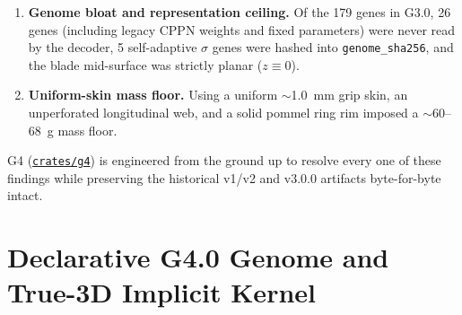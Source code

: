 \documentclass[10pt,journal,letterpaper]{IEEEtran}
\DeclareRobustCommand{\code}[1]{\texorpdfstring{{\nolinkurl{#1}}}{#1}}
\newcommand{\src}[2]{\href{https://github.com/neverhuman/jarambit/blob/v\GFourVersion/#1}{#2}}
\begin{document}
\begin{enumerate}
placeholder $0.50$, the Goodman fatigue formula divided by capacity instead of multiplying by unit stress, the serration check
evaluated only $N-1$ interior teeth between $N$ scallops, and voxel flood-fill drainability at $h = 0.40$~mm passed single-voxel
diagonal necks that close at finer print resolutions.
\item \textbf{Genome bloat and representation ceiling.} Of the 179 genes in G3.0, 26 genes (including legacy CPPN weights and
fixed parameters) were never read by the decoder, 5 self-adaptive $\sigma$ genes were hashed into \code{genome\_sha256}, and the
blade mid-surface was strictly planar ($z \equiv 0$).
\item \textbf{Uniform-skin mass floor.} Using a uniform $\sim$1.0~mm grip skin, an unperforated longitudinal web, and a solid
pommel ring rim imposed a $\sim$60--68~g mass floor.
\end{enumerate}

G4 (\src{crates/g4/src/lib.rs}{\code{crates/g4}}) is engineered from the ground up to resolve every one of these findings while
preserving the historical v1/v2 and v3.0.0 artifacts byte-for-byte intact.

\section{Declarative G4.0 Genome and True-3D Implicit Kernel}\label{sec:genome}
\end{document}
